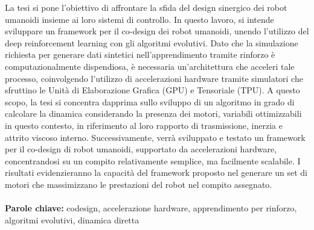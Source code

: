\documentclass{Configuration_Files/PoliMi3i_thesis}
\begin{document}
La tesi si pone l'obiettivo di affrontare la sfida del design sinergico dei robot umanoidi insieme ai loro sistemi di controllo. In questo lavoro, si
intende sviluppare un framework per il co-design dei robot umanoidi, unendo l'utilizzo del deep reinforcement learning con gli algoritmi evolutivi.
Dato che la simulazione richiesta per generare dati sintetici nell'apprendimento tramite rinforzo è computazionalmente dispendiosa, è necessaria
un'architettura che acceleri tale processo, coinvolgendo l'utilizzo di accelerazioni hardware tramite simulatori che sfruttino le Unità di Elaborazione Grafica
(GPU) e Tensoriale (TPU). A questo scopo, la tesi si concentra dapprima sullo sviluppo di un algoritmo in grado di calcolare la dinamica considerando la
presenza dei motori, variabili ottimizzabili in questo contesto, in riferimento al loro rapporto di trasmissione, inerzia e attrito viscoso interno.
Successivamente, verrà sviluppato e testato un framework per il co-design di robot umanoidi, supportato da accelerazioni hardware, concentrandosi su un
compito relativamente semplice, ma facilmente scalabile. I risultati evidenzieranno la capacità del framework proposto nel generare un set di motori
che massimizzano le prestazioni del robot nel compito assegnato.
\\
\\
\textbf{Parole chiave:} codesign, accelerazione hardware, apprendimento per rinforzo, algoritmi evolutivi, dinamica diretta %


\thispagestyle{empty}
\tableofcontents %
\thispagestyle{empty}
\cleardoublepage





\mainmatter %

\end{document}
